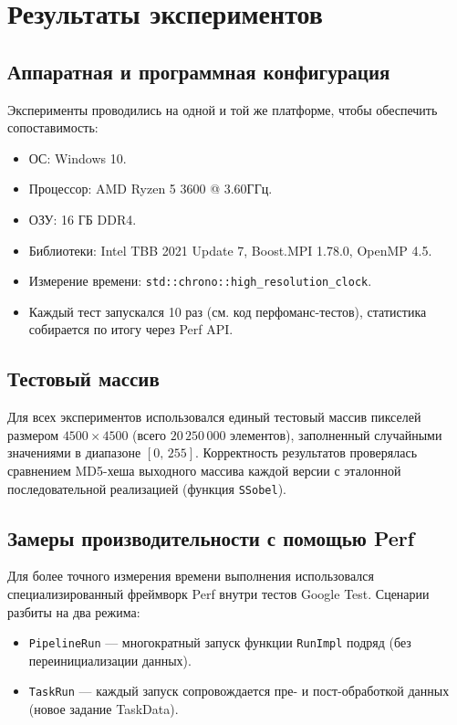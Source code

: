 \documentclass[12pt]{article}
\begin{document}
\section{Результаты экспериментов}

\subsection{Аппаратная и программная конфигурация}

Эксперименты проводились на одной и той же платформе, чтобы обеспечить сопоставимость:
\begin{itemize}
    \item ОС: Windows 10.
    \item Процессор: AMD Ryzen 5 3600 @ 3.60ГГц.
    \item ОЗУ: 16 ГБ DDR4.
    \item Библиотеки: Intel TBB 2021 Update 7, Boost.MPI 1.78.0, OpenMP 4.5.
    \item Измерение времени: \texttt{std::chrono::high\_resolution\_clock}.
    \item Каждый тест запускался 10 раз (см. код перфоманс-тестов), статистика собирается по итогу через Perf API.
\end{itemize}

\subsection{Тестовый массив}

Для всех экспериментов использовался единый тестовый массив пикселей размером $4500 \times 4500$ (всего $20\,250\,000$ элементов), заполненный случайными значениями в диапазоне $[0,\,255]$. Корректность результатов проверялась сравнением MD5-хеша выходного массива каждой версии с эталонной последовательной реализацией (функция \texttt{SSobel}).

\subsection{Замеры производительности с помощью Perf}

Для более точного измерения времени выполнения использовался специализированный фреймворк Perf внутри тестов Google Test. Сценарии разбиты на два режима:
\begin{itemize}
    \item \texttt{PipelineRun} — многократный запуск функции \texttt{RunImpl} подряд (без переинициализации данных).
    \item \texttt{TaskRun} — каждый запуск сопровождается пре- и пост-обработкой данных (новое задание TaskData).
\end{itemize}
\end{document}
